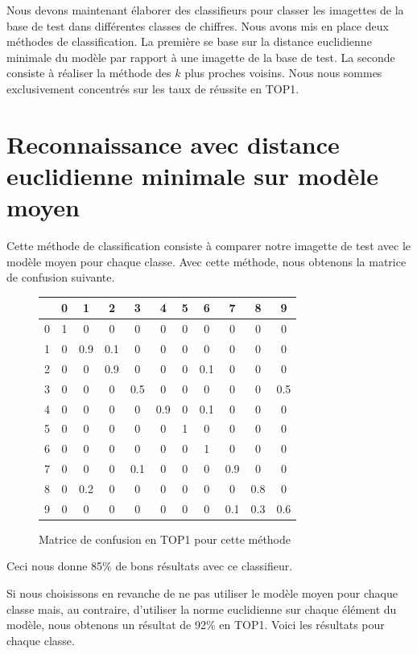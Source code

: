 Nous devons maintenant élaborer des classifieurs pour classer
les imagettes de la base de test dans différentes classes de chiffres.
Nous avons mis en place deux méthodes de classification. La première se 
base sur la distance euclidienne minimale du modèle par rapport à une
imagette de la base de test. La seconde consiste à réaliser la méthode des
$ k $ plus proches voisins. Nous nous sommes exclusivement concentrés sur les taux de réussite en TOP1.

\section{Reconnaissance avec distance euclidienne
minimale sur modèle moyen}

Cette méthode de classification consiste à comparer notre imagette de
test avec le modèle moyen pour chaque classe.
Avec cette méthode, nous obtenons la matrice de confusion suivante.

\begin{figure}[!h]
\centering
\begin{tabular}{|*{11}{c|}}
    \hline
     & 0 & 1 & 2 & 3 & 4 & 5 & 6 & 7 & 8 & 9 \\
    \hline
    0 & 1 & 0  & 0  & 0  & 0  & 0 & 0 & 0 & 0 & 0 \\
    \hline
    1 & 0 & 0.9 & 0.1 & 0  & 0 & 0 & 0 & 0 & 0 & 0 \\
    \hline
    2 & 0 & 0 & 0.9 & 0 & 0 & 0 & 0.1 & 0 & 0 & 0 \\
    \hline
    3 & 0 & 0 & 0 & 0.5 & 0 & 0 & 0 & 0 & 0 & 0.5 \\
    \hline
    4 & 0 & 0 & 0 & 0 & 0.9 & 0 & 0.1 & 0 & 0 & 0 \\
    \hline
    5 & 0 & 0 & 0 & 0 & 0 & 1 & 0 & 0 & 0 & 0 \\
    \hline
    6 & 0 & 0 & 0 & 0 & 0 & 0 & 1 & 0 & 0 & 0 \\
    \hline
    7 & 0 & 0 & 0 & 0.1 & 0 & 0 & 0 & 0.9 & 0 & 0 \\
    \hline
    8 & 0 & 0.2 & 0 & 0 & 0 & 0 & 0 & 0 & 0.8 & 0 \\
    \hline
    9 & 0 & 0 & 0 & 0 & 0 & 0 & 0 & 0.1 & 0.3 & 0.6 \\
    \hline
\end{tabular}
\caption{Matrice de confusion en TOP1 pour cette méthode}
\end{figure} 

Ceci nous donne 85\% de bons résultats avec ce classifieur.

Si nous choisissons en revanche de ne pas utiliser le modèle moyen
pour chaque classe mais, au contraire, d'utiliser la norme euclidienne
sur chaque élément du modèle, nous obtenons un résultat de 92\% en TOP1. Voici 
les résultats pour chaque classe.

